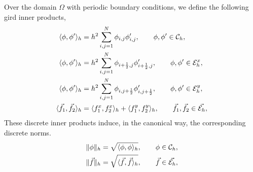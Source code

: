 \par Over the domain $\Omega$ with periodic boundary conditions, we define the following gird inner products,
\begin{subequations}
    \begin{align}
        \langle \phi,\phi'\rangle_h&=h^2\sum_{i,j=1}^N \phi_{i,j}\phi'_{i,j},\qquad \phi,\phi'\in {\mathcal{C}_h},\\
        \langle \phi,\phi'\rangle_h&=h^2\sum_{i,j=1}^N \phi_{i+\frac{1}{2},j}\phi'_{i+\frac{1}{2},j},\qquad \phi,\phi'\in {\mathcal{E}^x_h},\\
        \langle \phi,\phi'\rangle_h&=h^2\sum_{i,j=1}^N \phi_{i,j+\frac{1}{2}}\phi'_{i,j+\frac{1}{2}},\qquad \phi,\phi'\in {\mathcal{E}^y_h},\\
        \langle \vec{f_1},\vec{f_2}\rangle_h&=\langle f_1^x,f_2^x\rangle_h + \langle f_1^y,f_2^y\rangle_h,\qquad \vec{f_1},\vec{f_2}\in {\vec{\mathcal{E}_h}},
    \end{align}
\end{subequations}
These discrete inner products induce, in the canonical way, the corresponding discrete norms.
\begin{subequations}
    \begin{align}
        \|\phi\|_h&=\sqrt{\langle \phi,\phi \rangle_h},\qquad \phi\in {\mathcal{C}_h},\\
        \|\vec{f}\|_h&=\sqrt{\langle \vec{f},\vec{f} \rangle_h},\qquad \vec{f}\in {\vec{\mathcal{E}_h}},
    \end{align}
\end{subequations}

